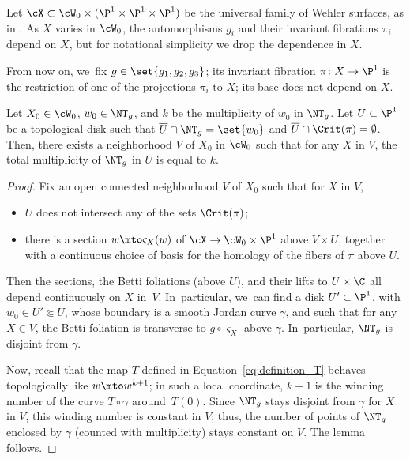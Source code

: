 Let $\cX\subset \cW_0\times (\P^1\times \P^1\times \P^1)$ be
the universal family of Wehler surfaces, as in \cite[\S 2]{finite_orbits}.
As $X$ varies in $ \cW_0$, the automorphisms $g_i$ and their
invariant fibrations $\pi_i$ depend on $X$, but for notational simplicity we drop the dependence in $X$.

From now on, we~fix $g\in \set{g_1, g_2, g_3}$; its invariant fibration $\pi\colon X\to \P^1$ is the restriction of one of the projections $\pi_i$ to $X$; its base does not depend on $X$.

\begin{lem}\label{lem:NT_local}
Let $X_0\in \cW_0$, $w_0\in \NT_g$, and $k$ be the multiplicity of $w_0$ in $\NT_g$.
Let $U\subset \P^1$ be a topological disk such that $\overline U\cap \NT_g = \set{w_0}$ and $\overline U\cap \Crit(\pi)=\emptyset$.
Then, there exists a neighborhood $V$
of $X_0$ in $\cW_0$ such that for any $X$ in $V$, the total multiplicity of
$\NT_g$ in $U$ is equal to $k$.
\end{lem}

\begin{proof}
Fix an open connected neighborhood $V$ of $X_0$ such that for $X$ in $V$,
\begin{itemize}
\item $U$ does not intersect any of the sets $\Crit(\pi)$;
\item there is a section $w\mto \varsigma_X(w)$
of $\cX\to \cW_0\times \P^1$ above $V\times U$, together with a continuous choice of basis for the homology of the fibers of $\pi$ above $U$.
\end{itemize}
Then the sections, the Betti foliations (above $U$), and their lifts to $U\times \C$ all
depend continuously on $X$ in~$V$. In~particular, we~can find a disk $U'\subset \P^1$, with
$w_0\in U'\Subset U$, whose boundary is a
smooth Jordan curve $\gamma$, and such that
for any $X\in V$, the Betti foliation is transverse to $g\circ \varsigma_X$ above $\gamma$. In~particular,
$\NT_g$ is disjoint from $\gamma$.

Now, recall that the map $T$ defined in Equation~\eqref{eq:definition_T}
behaves topologically like $w\mto w^{k+1}$; in such a local coordinate,
$k+1$ is the winding number of the curve $T\circ \gamma$ around~$T(0)$.
Since $\NT_g$ stays disjoint from $\gamma$ for $X$ in $V$,
this winding number is constant in $V$; thus, the number of points of $\NT_g$ enclosed by $\gamma$ (counted with multiplicity) stays constant on $V$. The
lemma follows.
\end{proof}

